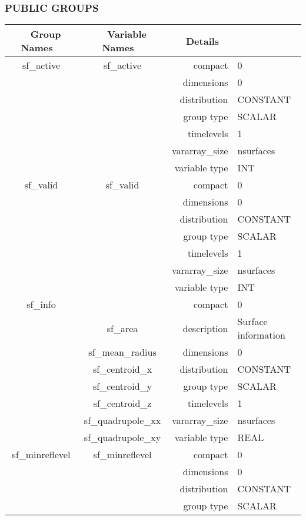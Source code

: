 \vspace{5mm}\subsubsection{PUBLIC GROUPS}

\vspace{5mm}

\begin{tabular*}{150mm}{|c|c@{\extracolsep{\fill}}|rl|} \hline 
~ {\bf Group Names} ~ & ~ {\bf Variable Names} ~  &{\bf Details} ~ & ~\\ 
\hline 
sf\_active & sf\_active & compact & 0 \\ 
 &  & dimensions & 0 \\ 
 &  & distribution & CONSTANT \\ 
 &  & group type & SCALAR \\ 
 &  & timelevels & 1 \\ 
 &  & vararray\_size & nsurfaces \\ 
 &  & variable type & INT \\ 
\hline 
sf\_valid & sf\_valid & compact & 0 \\ 
 &  & dimensions & 0 \\ 
 &  & distribution & CONSTANT \\ 
 &  & group type & SCALAR \\ 
 &  & timelevels & 1 \\ 
 &  & vararray\_size & nsurfaces \\ 
 &  & variable type & INT \\ 
\hline 
sf\_info &  & compact & 0 \\ 
 & sf\_area & description & Surface information \\ 
 & sf\_mean\_radius & dimensions & 0 \\ 
 & sf\_centroid\_x & distribution & CONSTANT \\ 
 & sf\_centroid\_y & group type & SCALAR \\ 
 & sf\_centroid\_z & timelevels & 1 \\ 
 & sf\_quadrupole\_xx & vararray\_size & nsurfaces \\ 
 & sf\_quadrupole\_xy & variable type & REAL \\ 
\hline 
sf\_minreflevel & sf\_minreflevel & compact & 0 \\ 
 &  & dimensions & 0 \\ 
 &  & distribution & CONSTANT \\ 
 &  & group type & SCALAR \\ 

\end{tabular*}
